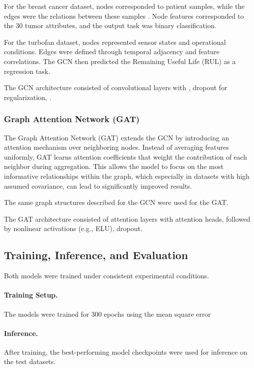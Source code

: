 \documentclass[12pt]{article}
\begin{document}
For the breast cancer dataset, nodes corresponded to patient samples, while the edges were the relations between these samples . Node features corresponded to the 30 tumor attributes, and the output task was binary classification.  

For the turbofan dataset, nodes represented sensor states and operational conditions. Edges were defined through temporal adjacency and feature correlations. The GCN then predicted the Remaining Useful Life (RUL) as a regression task.  

The GCN architecture consisted of  convolutional layers with , dropout for regularization, .  

\subsubsection{Graph Attention Network (GAT)}  
The Graph Attention Network (GAT) extends the GCN by introducing an attention mechanism over neighboring nodes. Instead of averaging features uniformly, GAT learns attention coefficients that weight the contribution of each neighbor during aggregation. This allows the model to focus on the most informative relationships within the graph, which especially in datasets with high assumed covariance, can lead to significantly improved results.  

The same graph structures described for the GCN were used for the GAT.

The GAT architecture consisted of  attention layers with  attention heads, followed by nonlinear activations (e.g., ELU), dropout.


\subsection{Training, Inference, and Evaluation}  

Both models were trained under consistent experimental conditions.  

\paragraph{Training Setup.}
The models were trained for 300 epochs using the mean square error

\paragraph{Inference.} After training, the best-performing model checkpoints were used for inference on the test datasets.  
\end{document}
